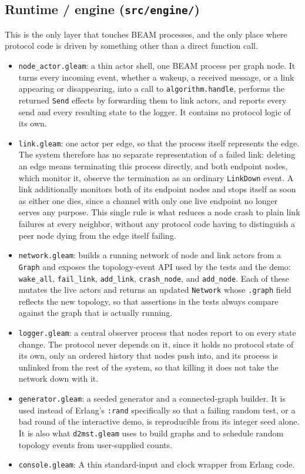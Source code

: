 \subsection{Runtime / engine (\texttt{src/engine/})} \label{sec:link-actor}

This is the only layer that touches BEAM processes, and the only place where protocol code
is driven by something other than a direct function call.

\begin{itemize}
  \item \texttt{node\_actor.gleam}: a thin actor shell, one BEAM process per graph node.
  It turns every incoming event, whether a wakeup, a received message, or a link
  appearing or disappearing, into a call to \texttt{algorithm.handle}, performs the
  returned \texttt{Send} effects by forwarding them to link actors, and reports every send
  and every resulting state to the logger. It contains no protocol logic of its own.
  \item \texttt{link.gleam}: one actor per edge, so that the process itself represents the
  edge. The system therefore has no separate representation of a failed link: deleting an
  edge means terminating this process directly, and both endpoint nodes, which monitor it,
  observe the termination as an ordinary \texttt{LinkDown} event. A link additionally
  monitors both of its endpoint nodes and stops itself as soon as either one dies, since a
  channel with only one live endpoint no longer serves any purpose. This single rule is
  what reduces a node crash to plain link failures at every neighbor, without any protocol
  code having to distinguish a peer node dying from the edge itself failing.
  \item \texttt{network.gleam}: builds a running network of node and link actors from a
  \texttt{Graph} and exposes the topology-event API used by the tests and the demo:
  \texttt{wake\_all}, \texttt{fail\_link}, \texttt{add\_link}, \texttt{crash\_node}, and
  \texttt{add\_node}. Each of these mutates the live actors and returns an updated
  \texttt{Network} whose \texttt{.graph} field reflects the new topology, so that
  assertions in the tests always compare against the graph that is actually running.
  \item \texttt{logger.gleam}: a central observer process that nodes report to on every
  state change. The protocol never depends on
  it, since it holds no protocol state of its own, only an ordered history that nodes push
  into, and its process is unlinked from the rest of the system, so that killing it does not take the network down with it.
  \item \texttt{generator.gleam}: a seeded generator and a
  connected-graph builder. It is used instead of Erlang's \texttt{:rand} specifically so
  that a failing random test, or a bad round of the interactive demo, is reproducible from
  its integer seed alone. It is also what \texttt{d2mst.gleam} uses to build graphs and to
  schedule random topology events from user-supplied counts.
  \item \texttt{console.gleam}: A thin standard-input and clock wrapper from Erlang code.
\end{itemize}

